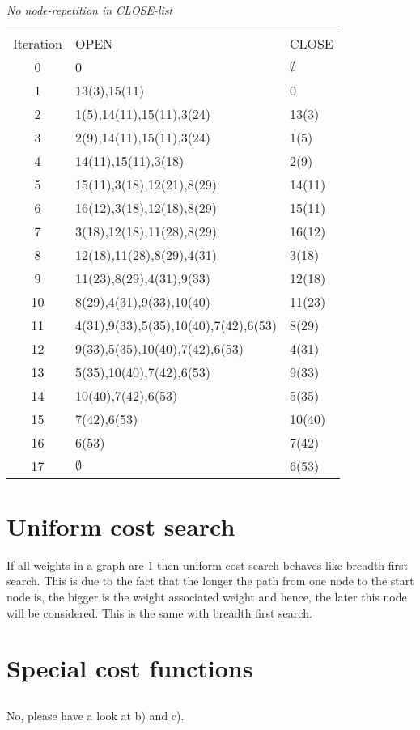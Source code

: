 \documentclass[11pt]{article}
\begin{document}
\emph{No node-repetition in CLOSE-list\\}
\begin{tabular}{ c | l | l }
  Iteration & OPEN & CLOSE \\
  0 	&	0 										& 	$\emptyset$ \\
  1		&	13(3),15(11)							&	0			\\
  2		&	1(5),14(11),15(11),3(24)				&	13(3)		\\
  3		&	2(9),14(11),15(11),3(24)				&	1(5)		\\
  4		&	14(11),15(11),3(18)						&	2(9)		\\
  5		&	15(11),3(18),12(21),8(29)				&	14(11)		\\
  6		&	16(12),3(18),12(18),8(29)				&	15(11)		\\
  7		&	3(18),12(18),11(28),8(29)				&	16(12)		\\
  8		&	12(18),11(28),8(29),4(31)				&	3(18)		\\
  9		&	11(23),8(29),4(31),9(33)				&	12(18)		\\
  10	&	8(29),4(31),9(33),10(40)				&	11(23)		\\
  11	&	4(31),9(33),5(35),10(40),7(42),6(53)	&	8(29)		\\
  12	&	9(33),5(35),10(40),7(42),6(53)			&	4(31)		\\
  13	&	5(35),10(40),7(42),6(53)				&	9(33)		\\
  14	&	10(40),7(42),6(53)						&	5(35)		\\
  15	&	7(42),6(53)								&	10(40)		\\
  16	&	6(53)									&	7(42)		\\
  17	&	$\emptyset$								&	6(53)
 \end{tabular}
\section{Uniform cost search}
If all weights in a graph are $1$ then uniform cost search behaves like breadth-first search. This is due to the fact that the longer the path from one node to the start node is, the bigger is the weight associated weight and hence, the later this node will be considered. This is the same with breadth first search.

\setcounter{section}{4}
\section{Special cost functions}
\subsection{}
No, please have a look at b) and c).
\end{document}
